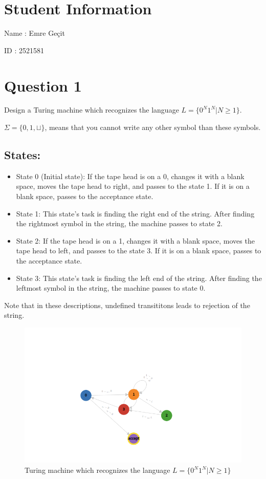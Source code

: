 \documentclass[12pt]{article}
\begin{document}
\section*{Student Information}

Name : Emre Geçit

ID : 2521581

\section*{Question 1}
Design a Turing machine which recognizes the language $L = \{0^N1^N | N \geq 1\}$.

$\Sigma = \{0, 1, \sqcup\}$, means that you cannot write any other symbol than these symbols.
\subsection*{States:}
\begin{itemize}
    \item State 0 (Initial state): If the tape head is on a 0, changes it with a blank space, moves the tape head to right, and passes to the state 1. If it is on a blank space, passes to the acceptance state.
    \item State 1: This state's task is finding the right end of the string. After finding the rightmost symbol in the string, the machine passes to state 2.
    \item State 2: If the tape head is on a 1, changes it with a blank space, moves the tape head to left, and passes to the state 3. If it is on a blank space, passes to the acceptance state.
    \item State 3: This state's task is finding the left end of the string. After finding the leftmost symbol in the string, the machine passes to state 0.
\end{itemize}
Note that in these descriptions, undefined transititons leads to rejection of the string.
\begin{figure}[H]
    \caption{Turing machine which recognizes the language $L = \{0^N1^N | N \geq 1\}$}
    \centering
    \includegraphics[width=12cm]{Q1/turingmachine.io_.png}    
\end{figure}
\newpage
\end{document}
